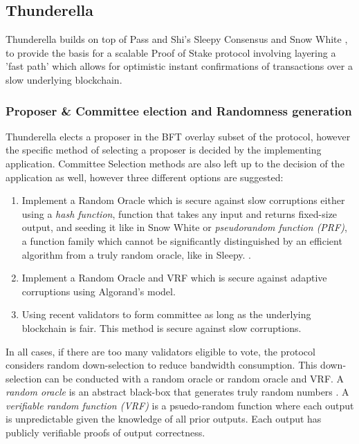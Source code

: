\documentclass[10pt,journal,compsoc]{IEEEtran}
\begin{document}
\subsection{Thunderella}
Thunderella \cite{Thunderella} builds on top of Pass and Shi's Sleepy Consensus \cite{Sleepy} and Snow White \cite{SnowWhite}, to provide the basis for a scalable
 Proof of Stake protocol involving layering a 'fast path' which allows for optimistic instant confirmations of transactions over a slow underlying blockchain. 

\subsubsection{Proposer \& Committee election and Randomness generation}

Thunderella elects a proposer in the BFT overlay subset of the protocol, however the specific method of selecting a proposer is decided by the implementing application. Committee Selection methods are also left up to the decision of the application as well, however three different options are suggested:
\begin{enumerate} \item Implement a Random Oracle which is secure against slow corruptions either using a \emph{hash function}, function that takes any input and returns fixed-size output, \indent and seeding it like in Snow White
\cite{SnowWhite} or  \emph{pseudorandom function (PRF)}, a function family which cannot be significantly distinguished by an efficient algorithm from a truly random oracle, like in Sleepy. \cite{Sleepy}.
\item Implement a Random Oracle and VRF which is secure \indent against adaptive corruptions using Algorand's model.
\item Using recent validators to form committee as long as the underlying blockchain is fair. This method is secure against slow corruptions.
\end{enumerate}

In all cases, if there are too many validators eligible to vote, the protocol considers random down-selection to reduce bandwidth consumption. This down-selection can be conducted with a random oracle or random oracle and VRF.
A \emph{random oracle} is an abstract black-box that generates truly random numbers \cite{Mahnush}. A \emph{verifiable random function (VRF)} is a psuedo-random function where each output is unpredictable given the knowledge of all prior outputs. Each output has publicly verifiable proofs of output correctness. \cite{MicaliEtAl} 
\end{document}
